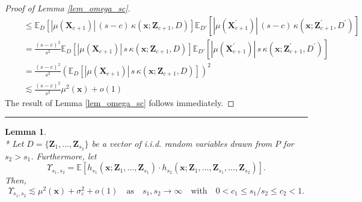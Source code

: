\documentclass[letterpaper,10pt]{article}
\numberwithin{equation}{section}
\numberwithin{thm}{section}
\newtheorem{lem}{Lemma}
\numberwithin{lem}{section}
\numberwithin{cor}{section}
\newcommand{\E}{\mathbb{E}}
\newcommand{\1}{\mathbbm{1}}
\begin{document}
\begin{proof}[Proof of Lemma \ref{lem_omega_sc}]
\begin{equation}
\begin{aligned}
			 & \quad \leq \E_{D}\left[|\mu(\mathbf{X}_{c+1})|\, (s-c) \, \kappa\left(\mathbf{x}; \mathbf{Z}_{c+1}, D\right)\right]
			\E_{D'}\left[|\mu(\mathbf{X}_{c+1}^{\prime})|\, (s-c) \, \kappa\left(\mathbf{x}; \mathbf{Z}_{c+1}^{\prime}, D^{\prime}\right)\right]                                                                                      \\
			 & \quad = \frac{(s-c)^2}{s^2} \E_{D}\left[|\mu(\mathbf{X}_{c+1})|\, s \, \kappa\left(\mathbf{x}; \mathbf{Z}_{c+1}, D\right)\right]
			\E_{D'}\left[|\mu(\mathbf{X}_{c+1}^{\prime})|\, s \, \kappa\left(\mathbf{x}; \mathbf{Z}_{c+1}^{\prime}, D^{\prime}\right)\right]                                                                                          \\
			 & \quad = \frac{(s-c)^2}{s^2} \left(\E_{D}\left[|\mu(\mathbf{X}_{c+1})|\, s \, \kappa\left(\mathbf{x}; \mathbf{Z}_{c+1}, D\right)\right]\right)^2                                                                        \\
			 & \quad \lesssim \frac{(s-c)^2}{s^2}\mu^2(\mathbf{x}) + o(1)
		\end{aligned}
	\end{equation}
	The result of Lemma \ref{lem_omega_sc} follows immediately.
\end{proof}

\hrule

\begin{lem}\label{lem_upsilon_s}\mbox{}\\*
	Let $D = \{\mathbf{Z}_1, \dotsc, \mathbf{Z}_{s_2}\}$ be a vector of i.i.d. random variables drawn from $P$ for $s_2 > s_1$.
	Furthermore, let
	\begin{equation}
		\Upsilon_{s_1, s_2}
		= \E\left[h_{s_1}\left(\mathbf{x}; \mathbf{Z}_1, \ldots,  \mathbf{Z}_{s_1}\right) \cdot
			h_{s_2}\left(\mathbf{x}; \mathbf{Z}_1, \ldots,\mathbf{Z}_{s_1}, \ldots, \mathbf{Z}_{s_2}\right)\right].
	\end{equation}
	Then,
	\begin{equation}
		\Upsilon_{s_1, s_2}
		\lesssim \mu^{2}\left(\mathbf{x}\right) + \sigma^2_{\varepsilon} + o(1)
		\quad \text{as} \quad s_1, s_2 \rightarrow \infty
		\quad \text{with} \quad
		0 < c_1 \leq s_1 / s_2 \leq c_2 < 1.
	\end{equation}
\end{lem}
\end{document}
